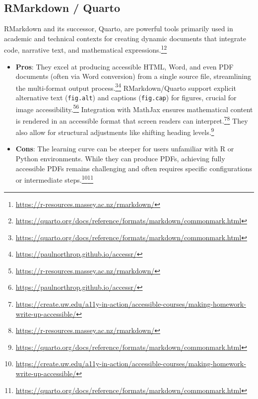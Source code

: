 \subsection{RMarkdown / Quarto}
RMarkdown and its successor, Quarto, are powerful tools primarily used in academic and technical contexts for creating dynamic documents that integrate code, narrative text, and mathematical expressions.\footnote{\url{https://r-resources.massey.ac.nz/rmarkdown/}}\footnote{\url{https://quarto.org/docs/reference/formats/markdown/commonmark.html}}
\begin{itemize}[noitemsep,topsep=0pt]
    \item \textbf{Pros}: They excel at producing accessible HTML, Word, and even PDF documents (often via Word conversion) from a single source file, streamlining the multi-format output process.\footnote{\url{https://quarto.org/docs/reference/formats/markdown/commonmark.html}}\footnote{\url{https://paulnorthrop.github.io/accessr/}} RMarkdown/Quarto support explicit alternative text (\texttt{fig.alt}) and captions (\texttt{fig.cap}) for figures, crucial for image accessibility.\footnote{\url{https://r-resources.massey.ac.nz/rmarkdown/}}\footnote{\url{https://paulnorthrop.github.io/accessr/}} Integration with MathJax ensures mathematical content is rendered in an accessible format that screen readers can interpret.\footnote{\url{https://create.uw.edu/a11y-in-action/accessible-courses/making-homework-write-up-accessible/}}\footnote{\url{https://r-resources.massey.ac.nz/rmarkdown/}} They also allow for structural adjustments like shifting heading levels.\footnote{\url{https://quarto.org/docs/reference/formats/markdown/commonmark.html}}
    \item \textbf{Cons}: The learning curve can be steeper for users unfamiliar with R or Python environments. While they can produce PDFs, achieving fully accessible PDFs remains challenging and often requires specific configurations or intermediate steps.\footnote{\url{https://create.uw.edu/a11y-in-action/accessible-courses/making-homework-write-up-accessible/}}\footnote{\url{https://quarto.org/docs/reference/formats/markdown/commonmark.html}}
\end{itemize}


